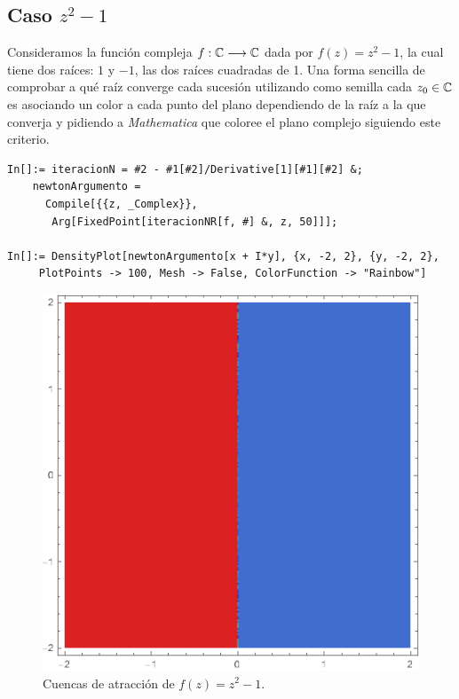 \subsection{Caso $z^2-1$}
\label{subsection:cuencas-1}

Consideramos la función compleja $f:\mathbb{C}\longrightarrow\mathbb{C}$ dada por $f(z)=z^2-1$, la cual tiene dos raíces: $1$ y $-1$, las dos raíces cuadradas de 1. Una forma sencilla de comprobar a qué raíz converge cada sucesión utilizando como semilla cada $z_0\in\mathbb{C}$ es asociando un color a cada punto del plano dependiendo de la raíz a la que converja y pidiendo a \textit{Mathematica} que coloree el plano complejo siguiendo este criterio.

\begin{verbatim}
In[]:= iteracionN = #2 - #1[#2]/Derivative[1][#1][#2] &;
    newtonArgumento = 
      Compile[{{z, _Complex}}, 
       Arg[FixedPoint[iteracionNR[f, #] &, z, 50]]];
    
In[]:= DensityPlot[newtonArgumento[x + I*y], {x, -2, 2}, {y, -2, 2}, 
     PlotPoints -> 100, Mesh -> False, ColorFunction -> "Rainbow"] 
\end{verbatim}

\begin{figure} [h]
\centering
\includegraphics[scale = 0.4]{img/cuencas-1.png}
\caption{Cuencas de atracción de $f(z)=z^2-1$.}
    \label{fig:cuencas-1}
\end{figure}

